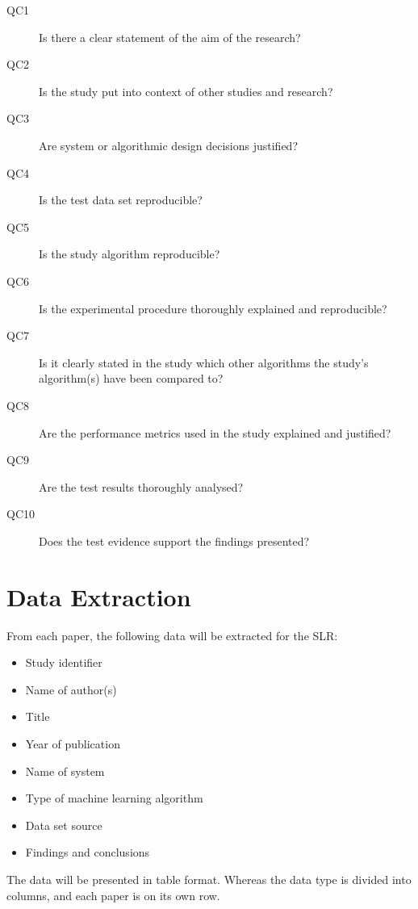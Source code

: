 \begin{description}

\item[QC1] Is there a clear statement of the aim of the research?
\item[QC2] Is the study put into context of other studies and research?
\item[QC3] Are system or algorithmic design decisions justified?
\item[QC4] Is the test data set reproducible?
\item[QC5] Is the study algorithm reproducible?
\item[QC6] Is the experimental procedure thoroughly explained and reproducible?
\item[QC7] Is it clearly stated in the study which other algorithms the study's algorithm(s) have been compared to?
\item[QC8] Are the performance metrics used in the study explained and justified?
\item[QC9] Are the test results thoroughly analysed?
\item[QC10] Does the test evidence support the findings presented?

\end{description}

\section{Data Extraction}

From each paper, the following data will be extracted for the SLR:

\begin{itemize}

\item Study identifier
\item Name of author(s) 
\item Title
\item Year of publication 
\item Name of system
\item Type of machine learning algorithm
\item Data set source
\item Findings and conclusions

\end{itemize}

The data will be presented in table format. Whereas the data type is divided into columns, and each paper is on its own row.